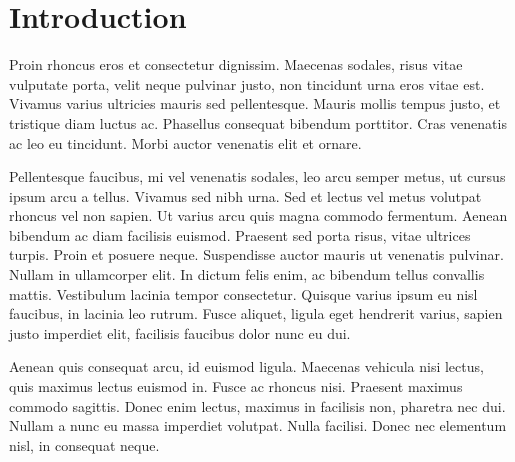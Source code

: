 \section{Introduction}

Proin rhoncus eros et consectetur dignissim. Maecenas sodales, risus vitae vulputate
porta, velit neque pulvinar justo, non tincidunt urna eros vitae est. Vivamus varius
ultricies mauris sed pellentesque. Mauris mollis tempus justo, et tristique diam
luctus ac. Phasellus consequat bibendum porttitor. Cras venenatis ac leo eu tincidunt.
Morbi auctor venenatis elit et ornare.

Pellentesque faucibus, mi vel venenatis sodales, leo arcu semper metus, ut cursus
ipsum arcu a tellus. Vivamus sed nibh urna. Sed et lectus vel metus volutpat rhoncus
vel non sapien. Ut varius arcu quis magna commodo fermentum. Aenean bibendum ac
diam facilisis euismod. Praesent sed porta risus, vitae ultrices turpis. Proin et
posuere neque. Suspendisse auctor mauris ut venenatis pulvinar. Nullam in ullamcorper
elit. In dictum felis enim, ac bibendum tellus convallis mattis. Vestibulum lacinia
tempor consectetur. Quisque varius ipsum eu nisl faucibus, in lacinia leo rutrum.
Fusce aliquet, ligula eget hendrerit varius, sapien justo imperdiet elit, facilisis
faucibus dolor nunc eu dui.

Aenean quis consequat arcu, id euismod ligula. Maecenas vehicula nisi lectus, quis
maximus lectus euismod in. Fusce ac rhoncus nisi. Praesent maximus commodo sagittis.
Donec enim lectus, maximus in facilisis non, pharetra nec dui. Nullam a nunc eu
massa imperdiet volutpat. Nulla facilisi. Donec nec elementum nisl, in consequat
neque.